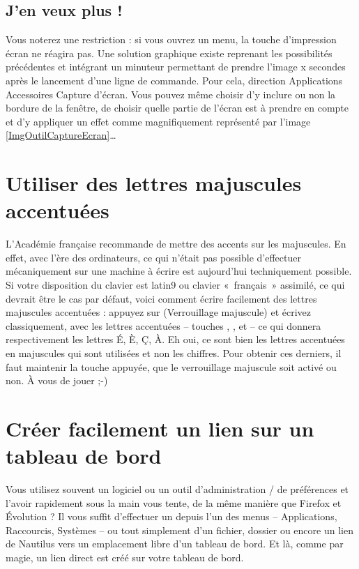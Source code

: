 \subsection{J'en veux plus !}
Vous noterez une restriction : si vous ouvrez un menu, la touche d'impression écran  ne réagira pas. Une solution graphique existe reprenant les possibilités précédentes et intégrant un minuteur permettant de prendre l'image x secondes après le lancement d'une ligne de commande. Pour cela, direction Applications \FlecheDroite Accessoires \FlecheDroite Capture d'écran. Vous pouvez même choisir d'y inclure ou non la bordure de la fenêtre, de choisir quelle partie de l'écran est à prendre en compte et d'y appliquer un effet comme magnifiquement représenté par l'image \ref{ImgOutilCaptureEcran}\ldots{}
\section{Utiliser des lettres majuscules accentuées}
\label{refMajAccent}
L'Académie française recommande de mettre des accents sur les majuscules. En effet, avec l'ère des ordinateurs, ce qui n'était pas possible d'effectuer mécaniquement sur une machine à écrire est aujourd'hui techniquement possible.\\
Si votre disposition du clavier est latin9 ou clavier «~français~» assimilé, ce qui devrait être le cas par défaut, voici comment écrire facilement des lettres majuscules accentuées : appuyez sur  (Verrouillage majuscule) et écrivez classiquement, avec les lettres accentuées -- touches  ,  ,   et   -- ce qui donnera respectivement les lettres É, È, Ç, À. Eh oui, ce sont bien les lettres accentuées  en majuscules qui sont utilisées et non les chiffres. Pour obtenir ces derniers, il faut maintenir la touche  appuyée, que le verrouillage majuscule soit activé ou non. À vous de jouer ;-)
\section{Créer facilement un lien sur un tableau de bord}
Vous utilisez souvent un logiciel ou un outil d'administration / de préférences et l'avoir rapidement sous la main vous tente, de la même manière que Firefox et Évolution ? Il vous suffit d'effectuer un  depuis l'un des menus -- Applications, Raccourcis, Systèmes -- ou tout simplement d'un fichier, dossier ou encore un lien de Nautilus vers un emplacement libre d'un tableau de bord. Et là, comme par magie, un lien direct est créé sur votre tableau de bord.
